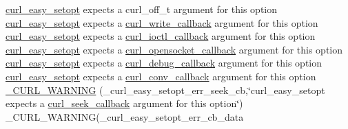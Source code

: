 \begin{DoxyCompactItemize}
\item 
\hyperlink{easy_8h_a7b171739b7bb728b3b58b2e6ec454aa0}{curl\+\_\+easy\+\_\+setopt} expects a curl\+\_\+off\+\_\+t argument for this option \hyperlink{easy_8h_a7b171739b7bb728b3b58b2e6ec454aa0}{curl\+\_\+easy\+\_\+setopt} expects a \hyperlink{curl_8h_ad65e62dcde45b356254b0f25f38dd802}{curl\+\_\+write\+\_\+callback} argument for this option \hyperlink{easy_8h_a7b171739b7bb728b3b58b2e6ec454aa0}{curl\+\_\+easy\+\_\+setopt} expects a \hyperlink{curl_8h_ae0524f6ec082005e39eb275c71c59a3b}{curl\+\_\+ioctl\+\_\+callback} argument for this option \hyperlink{easy_8h_a7b171739b7bb728b3b58b2e6ec454aa0}{curl\+\_\+easy\+\_\+setopt} expects a \hyperlink{curl_8h_a1b8b8f3e1a4e538a6bb1dd83a3388547}{curl\+\_\+opensocket\+\_\+callback} argument for this option \hyperlink{easy_8h_a7b171739b7bb728b3b58b2e6ec454aa0}{curl\+\_\+easy\+\_\+setopt} expects a \hyperlink{curl_8h_a50147c55283ee1fa3322b0d5aff2326c}{curl\+\_\+debug\+\_\+callback} argument for this option \hyperlink{easy_8h_a7b171739b7bb728b3b58b2e6ec454aa0}{curl\+\_\+easy\+\_\+setopt} expects a \hyperlink{curl_8h_acb230bf6dbf7bcb6e4e8740ea42ca3b3}{curl\+\_\+conv\+\_\+callback} argument for this option \hyperlink{typecheck-gcc_8h_a303ce695f02a9c140c9e09dd415d12d6}{\+\_\+\+C\+U\+R\+L\+\_\+\+W\+A\+R\+N\+I\+N\+G} (\+\_\+curl\+\_\+easy\+\_\+setopt\+\_\+err\+\_\+seek\+\_\+cb,\char`\"{}curl\+\_\+easy\+\_\+setopt expects a \hyperlink{curl_8h_a8ea5d0b350bebdf47cfb237e7caac14a}{curl\+\_\+seek\+\_\+callback} argument for this option\char`\"{}) \+\_\+\+C\+U\+R\+L\+\_\+\+W\+A\+R\+N\+I\+N\+G(\+\_\+curl\+\_\+easy\+\_\+setopt\+\_\+err\+\_\+cb\+\_\+data
\item 

\end{DoxyCompactItemize}
